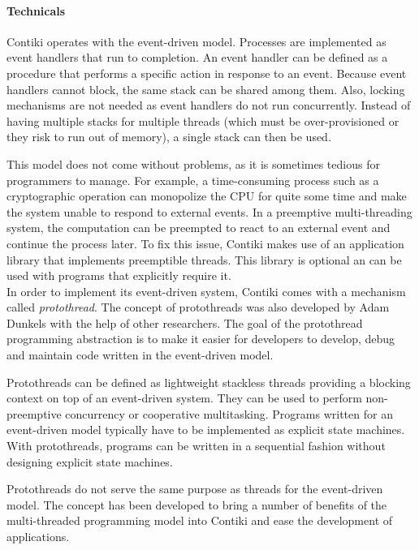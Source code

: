 \paragraph{Technicals} Contiki operates with the event-driven model.
Processes are implemented as event handlers that run to completion.
An event handler can be defined as a procedure that performs a specific action in response to an event.
Because event handlers cannot block, the same stack can be shared among them.
Also, locking mechanisms are not needed as event handlers do not run concurrently.
Instead of having multiple stacks for multiple threads (which must be over-provisioned or they risk to run out of memory), a single stack can then be used.

This model does not come without problems, as it is sometimes tedious for programmers to manage.
For example, a time-consuming process such as a cryptographic operation can monopolize the CPU for quite some time 
    and make the system unable to respond to external events. 
In a preemptive multi-threading system, the computation can be preempted to react to an external event 
    and continue the process later.
To fix this issue, Contiki makes use of an application library that implements preemptible threads.
This library is optional an can be used with programs that explicitly require it.\\

In order to implement its event-driven system, Contiki comes with a mechanism called \textit{protothread}\cite{protothreads}.
The concept of protothreads was also developed by Adam Dunkels with the help of other researchers.
The goal of the protothread programming abstraction is to make it easier for developers to develop, debug and maintain code written in the event-driven model.

Protothreads can be defined as lightweight stackless threads providing a blocking context on top of an event-driven system.
They can be used to perform non-preemptive concurrency or cooperative multitasking.
Programs written for an event-driven model typically have to be implemented as explicit state machines.
With protothreads, programs can be written in a sequential fashion without designing explicit state machines.

Protothreads do not serve the same purpose as threads for the event-driven model.
The concept has been developed to bring a number of benefits of the multi-threaded programming model into Contiki
    and ease the development of applications.\\

